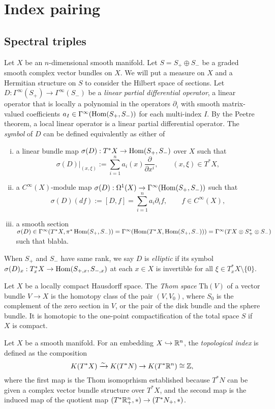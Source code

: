 \documentclass{../../large}
\begin{document}
\chapter{Index pairing}



\section{Spectral triples}


\begin{prb}
Let $X$ be an $n$-dimensional smooth manifold.
Let $S=S_+\oplus S_-$ be a graded smooth complex vector bundles on $X$.
We will put a measure on $X$ and a Hermitian structure on $S$ to consider the Hilbert space of sections.
Let $D:\Gamma^\infty(S_+)\to\Gamma^\infty(S_-)$ be a \emph{linear partial differential operator}, a linear operator that is locally a polynomial in the operators $\partial_i$ with smooth matrix-valued coefficients $a_I\in\Gamma^\infty(\operatorname{Hom}(S_+,S_-))$ for each multi-index $I$.
By the Peetre theorem, a local linear operator is a linear partial differential operator.
The \emph{symbol} of $D$ can be defined equivalently as either of
\begin{enumerate}[(i)]
\item a linear bundle map $\sigma(D):T^*X\to\operatorname{Hom}(S_+,S_-)$ over $X$ such that
\[\sigma(D)|_{(x,\xi)}:=\sum_{i=1}^na_i(x)\frac{\partial}{\partial x^i},\qquad(x,\xi)\in T^*X,\]
\item a $C^\infty(X)$-module map $\sigma(D):\Omega^1(X)\to\Gamma^\infty(\operatorname{Hom}(S_+,S_-))$ such that
\[\sigma(D)(df):=[D,f]=\sum_{i=1}^na_i\partial_if,\qquad f\in C^\infty(X),\]
\item a smooth section $\sigma(D)\in\Gamma^\infty(T^*X,\pi^*\operatorname{Hom}(S_+,S_-))=\Gamma^\infty(\operatorname{Hom}(T^*X,\operatorname{Hom}(S_+,S_-)))=\Gamma^\infty(TX\otimes S_+^*\otimes S_-)$ such that blabla.
\end{enumerate}
When $S_+$ and $S_-$ have same rank, we say $D$ is \emph{elliptic} if its symbol $\sigma(D)_x:T_x^*X\to\operatorname{Hom}(S_{+,x},S_{-,x})$ at each $x\in X$ is invertible for all $\xi\in T_x^*X\setminus\{0\}$.
\end{prb}

\begin{prb}
Let $X$ be a locally compact Hausdorff space.
The \emph{Thom space} $\mathrm{Th}(V)$ of a vector bundle $V\to X$ is the homotopy class of the pair $(V,V_0)$, where $S_0$ is the complement of the zero section in $V$, or the pair of the disk bundle and the sphere bundle.
It is homotopic to the one-point compactification of the total space $S$ if $X$ is compact.

Let $X$ be a smooth manifold.
For an embedding $X\hookrightarrow\mathbb{R}^n$, the \emph{topological index} is defined as the composition
\[K(T^*X)\xrightarrow{\sim}K(T^*N)\to K(T^*\mathbb{R}^n)\cong\mathbb{Z},\]
where the first map is the Thom isomoprhism established because $T^*N$ can be given a complex vector bundle structure over $T^*X$, and the second map is the induced map of the quotient map $(T^*\mathbb{R}^n_+,*)\to(T^*N_+,*)$.

\end{prb}
\end{document}
